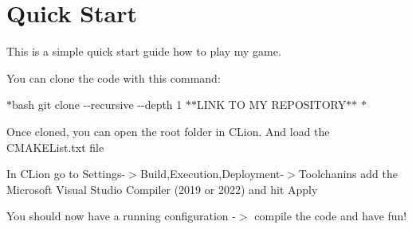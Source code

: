 \chapter{Quick Start }
\hypertarget{md_wiki_2game}{}\label{md_wiki_2game}
\label{md_wiki_2game_autotoc_md2}%
%


This is a simple quick start guide how to play my game.


\begin{DoxyEnumerate}
\item You can clone the code with this command\+:
\end{DoxyEnumerate}

\texorpdfstring{$\ast$}{*}{\ttfamily bash git clone -\/-\/recursive -\/-\/depth 1 \texorpdfstring{$\ast$}{*}\texorpdfstring{$\ast$}{*}\+LINK TO MY REPOSITORY\texorpdfstring{$\ast$}{*}\texorpdfstring{$\ast$}{*} \texorpdfstring{$\ast$}{*}}


\begin{DoxyEnumerate}
\item Once cloned, you can open the root folder in CLion. And load the {\ttfamily CMAKEList.\+txt} file
\item In CLion go to Settings-\/\texorpdfstring{$>$}{>}Build,Execution,Deployment-\/\texorpdfstring{$>$}{>}Toolchanins add the Microsoft Visual Studio Compiler (2019 or 2022) and hit Apply
\item You should now have a running configuration -\/\texorpdfstring{$>$}{>} compile the code and have fun! 
\end{DoxyEnumerate}